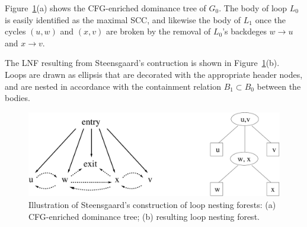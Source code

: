 Figure~\ref{FigLoopAnalysisRamalingamSteensgaardOverlayAndANF}(a)
shows the CFG-enriched dominance tree of $G_0$. The body of loop $L_0$
is easily identified as the maximal SCC, and likewise the body of
$L_1$ once the cycles $(u, w)$ and $(x,v)$ are broken by the removal
of $L_0$'s backdeges $w \to u$ and $x \to v$.

The LNF resulting from Steensgaard's contruction is shown in
Figure~\ref{FigLoopAnalysisRamalingamSteensgaardOverlayAndANF}(b). Loops
are drawn as ellipsis that are decorated with the appropriate header
nodes, and are nested in accordance with the containment relation $B_1
\subset B_0$ between the bodies.

  \begin{figure}
    \begin{center}
    \includegraphics[scale=0.4]{RamalingamSteensgaardOverlayAndLNF}
    \end{center}
    \caption{\label{FigLoopAnalysisRamalingamSteensgaardOverlayAndANF} 
       Illustration
       of Steensgaard's construction of loop nesting forests: 
       (a) CFG-enriched dominance tree;
       (b) resulting loop nesting forest.}
  \end{figure} 


